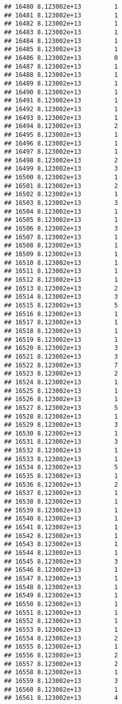 \documentclass[
]{article}
\begin{document}
\begin{verbatim}
## 16480 8.123002e+13         1
## 16481 8.123002e+13         1
## 16482 8.123002e+13         1
## 16483 8.123002e+13         1
## 16484 8.123002e+13         1
## 16485 8.123002e+13         1
## 16486 8.123002e+13         0
## 16487 8.123002e+13         1
## 16488 8.123002e+13         1
## 16489 8.123002e+13         1
## 16490 8.123002e+13         1
## 16491 8.123002e+13         1
## 16492 8.123002e+13         1
## 16493 8.123002e+13         1
## 16494 8.123002e+13         2
## 16495 8.123002e+13         1
## 16496 8.123002e+13         1
## 16497 8.123002e+13         1
## 16498 8.123002e+13         2
## 16499 8.123002e+13         3
## 16500 8.123002e+13         1
## 16501 8.123002e+13         2
## 16502 8.123002e+13         1
## 16503 8.123002e+13         3
## 16504 8.123002e+13         1
## 16505 8.123002e+13         1
## 16506 8.123002e+13         3
## 16507 8.123002e+13         1
## 16508 8.123002e+13         1
## 16509 8.123002e+13         1
## 16510 8.123002e+13         1
## 16511 8.123002e+13         1
## 16512 8.123002e+13         1
## 16513 8.123002e+13         2
## 16514 8.123002e+13         3
## 16515 8.123002e+13         5
## 16516 8.123002e+13         1
## 16517 8.123002e+13         1
## 16518 8.123002e+13         1
## 16519 8.123002e+13         1
## 16520 8.123002e+13         3
## 16521 8.123002e+13         3
## 16522 8.123002e+13         7
## 16523 8.123002e+13         2
## 16524 8.123002e+13         1
## 16525 8.123002e+13         1
## 16526 8.123002e+13         1
## 16527 8.123002e+13         5
## 16528 8.123002e+13         1
## 16529 8.123002e+13         3
## 16530 8.123002e+13         1
## 16531 8.123002e+13         3
## 16532 8.123002e+13         1
## 16533 8.123002e+13         1
## 16534 8.123002e+13         5
## 16535 8.123002e+13         1
## 16536 8.123002e+13         2
## 16537 8.123002e+13         1
## 16538 8.123002e+13         1
## 16539 8.123002e+13         1
## 16540 8.123002e+13         1
## 16541 8.123002e+13         1
## 16542 8.123002e+13         1
## 16543 8.123002e+13         1
## 16544 8.123002e+13         1
## 16545 8.123002e+13         3
## 16546 8.123002e+13         1
## 16547 8.123002e+13         1
## 16548 8.123002e+13         1
## 16549 8.123002e+13         1
## 16550 8.123002e+13         1
## 16551 8.123002e+13         1
## 16552 8.123002e+13         1
## 16553 8.123002e+13         1
## 16554 8.123002e+13         2
## 16555 8.123002e+13         1
## 16556 8.123002e+13         2
## 16557 8.123002e+13         2
## 16558 8.123002e+13         1
## 16559 8.123002e+13         3
## 16560 8.123002e+13         1
## 16561 8.123002e+13         4

\end{verbatim}
\end{document}
